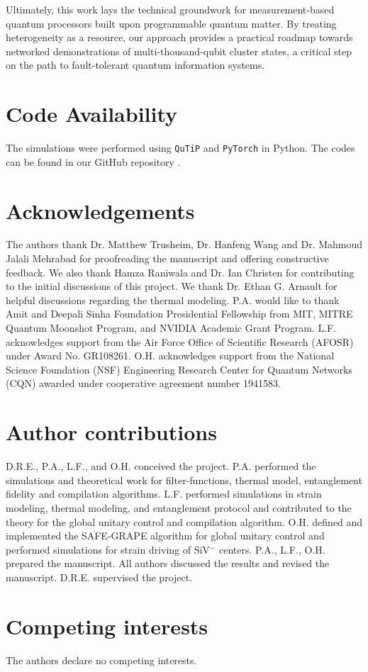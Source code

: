 \documentclass[%
 reprint,
 superscriptaddress,
 amsmath,amssymb,
 aps,
 prx,
]{revtex4-2}
\newcounter{algorithm} %
\begin{document}
Ultimately, this work lays the technical groundwork for measurement-based quantum processors built upon programmable quantum matter. By treating heterogeneity as a resource, our approach provides a practical roadmap towards networked demonstrations of multi-thousand-qubit cluster states, a critical step on the path to fault-tolerant quantum information systems.





\section{Code Availability}
The simulations were performed using \texttt{QuTiP} \cite{johansson2012qutip, johansson2013qutip, lambert2024qutip5quantumtoolbox} and \texttt{PyTorch} \cite{paszke2019pytorchimperativestylehighperformance} in Python. The codes can be found in our GitHub repository \cite{Git_Codes_2025}. 

\section{Acknowledgements}
The authors thank Dr. Matthew Trusheim, Dr. Hanfeng Wang and Dr. Mahmoud Jalali Mehrabad for proofreading the manuscript and offering constructive feedback. We also thank Hamza Raniwala and Dr. Ian Christen for contributing to the initial discussions of this project. We thank Dr. Ethan G. Arnault for helpful discussions regarding the thermal modeling. P.A. would like to thank Amit and Deepali Sinha Foundation Presidential Fellowship from MIT, MITRE Quantum
Moonshot Program, and NVIDIA Academic Grant Program. L.F. acknowledges support from the Air Force Office of Scientific Research (AFOSR) under Award No. GR108261. O.H. acknowledges support from the National Science Foundation (NSF) Engineering Research Center for Quantum Networks (CQN) awarded under cooperative agreement number 1941583.

\section{Author contributions}
D.R.E., P.A., L.F., and O.H. conceived the project. P.A. performed the simulations and theoretical work for filter-functions, thermal model, entanglement fidelity and compilation algorithms. L.F. performed simulations in strain modeling, thermal modeling, and entanglement protocol and contributed to the theory for the global unitary control and compilation algorithm. O.H. defined and implemented the SAFE-GRAPE algorithm for global unitary control and performed simulations for strain driving of SiV$^{-}$ centers. P.A., L.F., O.H. prepared the manuscript. All authors discussed the results and revised the manuscript. D.R.E. supervised the project.

\section{Competing interests}
The authors declare no competing interests.



\clearpage

\end{document}
